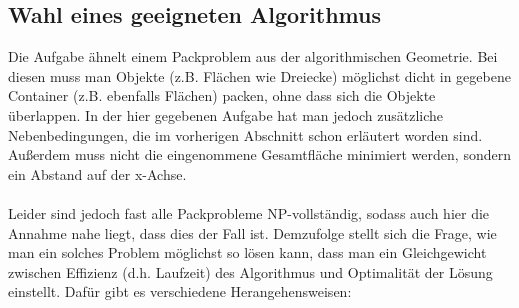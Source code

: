 \documentclass[a4paper, notitlepage, 12pt,headinclude]{scrartcl}
\begin{document}
 \subsection{Wahl eines geeigneten Algorithmus}
 Die Aufgabe ähnelt einem Packproblem aus der algorithmischen Geometrie. Bei diesen muss man Objekte (z.B. Flächen wie Dreiecke) möglichst dicht in gegebene Container (z.B. ebenfalls Flächen) packen, ohne dass sich die Objekte überlappen.\cite{Src:pack} In der hier gegebenen Aufgabe hat man jedoch zusätzliche Nebenbedingungen, die im vorherigen Abschnitt schon erläutert worden sind. Außerdem muss nicht die eingenommene Gesamtfläche minimiert werden, sondern ein Abstand auf der x-Achse. \\ \\
 Leider sind jedoch fast alle Packprobleme NP-vollständig, sodass auch hier die Annahme nahe liegt, dass dies der Fall ist. Demzufolge stellt sich die Frage, wie man ein solches Problem möglichst so lösen kann, dass man ein Gleichgewicht zwischen Effizienz (d.h. Laufzeit) des Algorithmus und Optimalität der Lösung einstellt. Dafür gibt es verschiedene Herangehensweisen:
\end{document}
